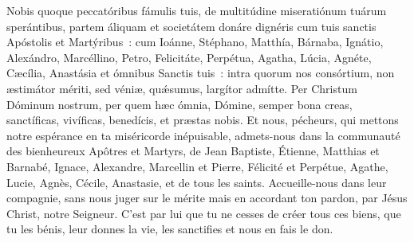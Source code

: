 \begin{paracol}{2}
\LigneParacol{0cm}
{Nobis quoque peccatóribus fámulis tuis, de multitúdine miseratiónum tuárum sperántibus, partem áliquam et societátem donáre dignéris cum tuis sanctis Apóstolis et Martýribus~: cum Ioánne, Stéphano, Matthía, Bárnaba, Ignátio, Alexándro, Marcéllino, Petro, Felicitáte, Perpétua, Agatha, Lúcia, Agnéte, Cæcília, Anastásia et ómnibus Sanctis tuis~: intra quorum nos consórtium, non æstimátor mériti, sed véniæ, quǽsumus, largítor admítte. Per Christum Dóminum nostrum, per quem hæc ómnia, Dómine, semper bona creas, sanctíficas, vivíficas, benedícis, et præstas nobis.}
{Et nous, pécheurs, qui mettons notre espérance en ta miséricorde inépuisable, admets-nous dans la communauté des bienheureux Apôtres et Martyrs, de Jean Baptiste, Étienne, Matthias et Barnabé, Ignace, Alexandre, Marcellin et Pierre, Félicité et Perpétue, Agathe, Lucie, Agnès, Cécile, Anastasie, et de tous les saints. Accueille-nous dans leur compagnie, sans nous juger sur le mérite mais en accordant ton pardon, par Jésus Christ, notre Seigneur. C'est par lui que tu ne cesses de créer tous ces biens, que tu les bénis, leur donnes la vie, les sanctifies et nous en fais le don.}

\end{paracol}

